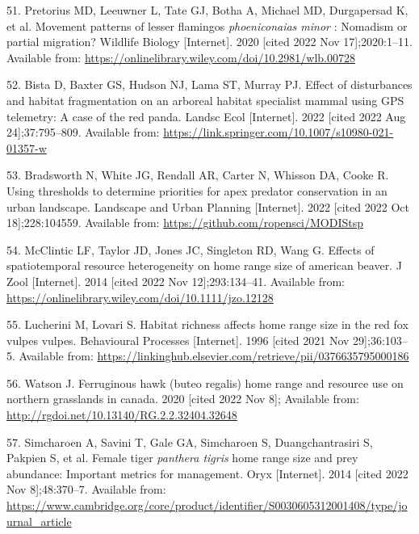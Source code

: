 \documentclass[
  12pt,
]{article}
\newlength{\cslhangindent}
\newenvironment{CSLReferences}[2] %
 {\begin{list}{}{%
  \setlength{\itemindent}{0pt}
  \setlength{\leftmargin}{0pt}
  \setlength{\parsep}{0pt}
  \ifodd #1
   \setlength{\leftmargin}{\cslhangindent}
   \setlength{\itemindent}{-1\cslhangindent}
  \fi
  \setlength{\itemsep}{#2\baselineskip}}}
 {\end{list}}
\begin{document}
\begin{CSLReferences}{0}{1}
51. Pretorius MD, Leeuwner L, Tate GJ, Botha A, Michael MD, Durgapersad K, et al. Movement patterns of lesser flamingos \emph{phoeniconaias minor} : Nomadism or partial migration? Wildlife Biology {[}Internet{]}. 2020 {[}cited 2022 Nov 17{]};2020:1--11. Available from: \url{https://onlinelibrary.wiley.com/doi/10.2981/wlb.00728}

52. Bista D, Baxter GS, Hudson NJ, Lama ST, Murray PJ. Effect of disturbances and habitat fragmentation on an arboreal habitat specialist mammal using {GPS} telemetry: A case of the red panda. Landsc Ecol {[}Internet{]}. 2022 {[}cited 2022 Aug 24{]};37:795--809. Available from: \url{https://link.springer.com/10.1007/s10980-021-01357-w}

53. Bradsworth N, White JG, Rendall AR, Carter N, Whisson DA, Cooke R. Using thresholds to determine priorities for apex predator conservation in an urban landscape. Landscape and Urban Planning {[}Internet{]}. 2022 {[}cited 2022 Oct 18{]};228:104559. Available from: \url{https://github.com/ropensci/MODIStsp}

54. McClintic LF, Taylor JD, Jones JC, Singleton RD, Wang G. Effects of spatiotemporal resource heterogeneity on home range size of american beaver. J Zool {[}Internet{]}. 2014 {[}cited 2022 Nov 12{]};293:134--41. Available from: \url{https://onlinelibrary.wiley.com/doi/10.1111/jzo.12128}

55. Lucherini M, Lovari S. Habitat richness affects home range size in the red fox vulpes vulpes. Behavioural Processes {[}Internet{]}. 1996 {[}cited 2021 Nov 29{]};36:103--5. Available from: \url{https://linkinghub.elsevier.com/retrieve/pii/0376635795000186}

56. Watson J. Ferruginous hawk (buteo regalis) home range and resource use on northern grasslands in canada. 2020 {[}cited 2022 Nov 8{]}; Available from: \url{http://rgdoi.net/10.13140/RG.2.2.32404.32648}

57. Simcharoen A, Savini T, Gale GA, Simcharoen S, Duangchantrasiri S, Pakpien S, et al. Female tiger \emph{panthera tigris} home range size and prey abundance: Important metrics for management. Oryx {[}Internet{]}. 2014 {[}cited 2022 Nov 8{]};48:370--7. Available from: \url{https://www.cambridge.org/core/product/identifier/S0030605312001408/type/journal_article}


\end{CSLReferences}
\end{document}
